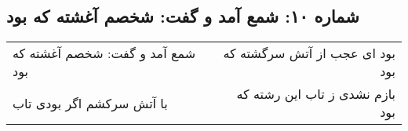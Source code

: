 \begin{center}
\section*{شماره ۱۰: شمع آمد و گفت: شخصم آغشته که بود}
\label{sec:010}
\begin{longtable}{l p{0.5cm} r}
شمع آمد و گفت: شخصم آغشته که بود
&&
بود ای عجب از آتش سرگشته که بود
\\
با آتش سرکشم اگر بودی تاب
&&
بازم نشدی ز تاب این رشته که بود
\\
\end{longtable}
\end{center}
